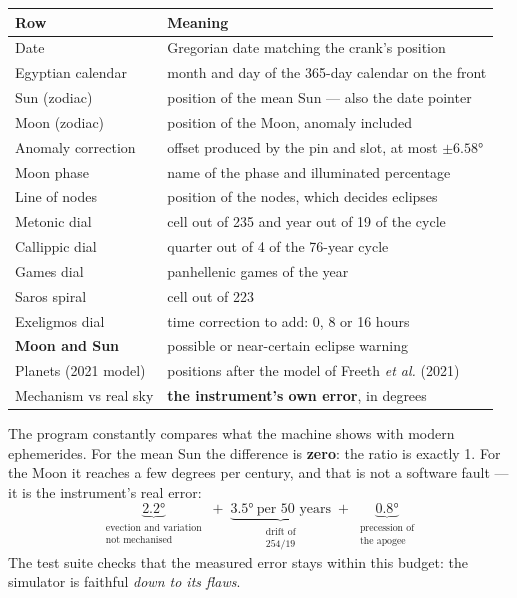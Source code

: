 \begin{center}
\small
\begin{tabularx}{\textwidth}{@{}lX@{}}
\toprule
\rowcolor{lightblue}\textbf{Row} & \textbf{Meaning} \\
\midrule
Date & Gregorian date matching the crank's position \\
Egyptian calendar & month and day of the 365-day calendar on the front \\
Sun (zodiac) & position of the mean Sun — also the date pointer \\
Moon (zodiac) & position of the Moon, anomaly included \\
Anomaly correction & offset produced by the pin and slot, at most $\pm 6.58°$ \\
Moon phase & name of the phase and illuminated percentage \\
Line of nodes & position of the nodes, which decides eclipses \\
Metonic dial & cell out of 235 and year out of 19 of the cycle \\
Callippic dial & quarter out of 4 of the 76-year cycle \\
Games dial & panhellenic games of the year \\
Saros spiral & cell out of 223 \\
Exeligmos dial & time correction to add: 0, 8 or 16 hours \\
\textbf{Moon and Sun} & possible or near-certain eclipse warning \\
Planets (2021 model) & positions after the model of Freeth \textit{et al.} (2021) \\
Mechanism vs real sky & \textbf{the instrument's own error}, in degrees \\
\bottomrule
\end{tabularx}
\end{center}

\begin{info}
The program constantly compares what the machine shows with modern ephemerides. For the mean
Sun the difference is \textbf{zero}: the ratio is exactly 1. For the Moon it reaches a few
degrees per century, and that is not a software fault — it is the instrument's real error:
\[
\underbrace{2.2°}_{\substack{\text{evection and variation}\\ \text{not mechanised}}}
\;+\;
\underbrace{3.5°\ \text{per 50 years}}_{\substack{\text{drift of}\\ 254/19}}
\;+\;
\underbrace{0.8°}_{\substack{\text{precession of}\\ \text{the apogee}}}
\]
The test suite checks that the measured error stays within this budget: the simulator is
faithful \emph{down to its flaws}.
\end{info}

